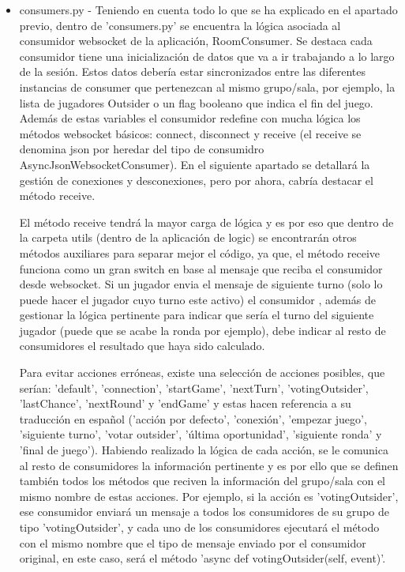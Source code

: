 \begin{itemize}
	\item consumers.py - Teniendo en cuenta todo lo que se ha explicado en el apartado previo, dentro de 'consumers.py' se encuentra la lógica asociada
	 	  al consumidor websocket de la aplicación, RoomConsumer. Se destaca cada consumidor tiene una inicialización de datos que va a ir trabajando
		  a lo largo de la sesión. Estos datos debería estar sincronizados entre las diferentes instancias de consumer que pertenezcan 
		  al mismo grupo/sala, por ejemplo, la lista de jugadores Outsider o un flag booleano que indica el fin del juego. Además de estas variables el consumidor 
		  redefine con mucha lógica los métodos websocket básicos: connect, disconnect y receive (el receive se denomina json por heredar del tipo de consumidro 
		  AsyncJsonWebsocketConsumer). En el siguiente apartado se detallará la gestión de conexiones y desconexiones, pero por ahora, cabría destacar el método receive.

		  El método receive tendrá la mayor carga de lógica y es por eso que dentro de la carpeta utils (dentro de la aplicación de logic) se encontrarán
		  otros métodos auxiliares para separar mejor el código, ya que, el método receive funciona como un gran switch en base al mensaje que reciba el
		  consumidor desde websocket. Si un jugador envia el mensaje de siguiente turno (solo lo puede hacer el jugador cuyo turno este activo) el consumidor 
		  , además de gestionar la lógica pertinente para indicar que sería el turno del siguiente jugador (puede que se acabe la ronda por ejemplo), debe indicar
		  al resto de consumidores el resultado que haya sido calculado.

		  Para evitar acciones erróneas, existe una selección de acciones posibles, que serían: 'default', 'connection', 'startGame', 'nextTurn', 
		  'votingOutsider', 'lastChance', 'nextRound' y 'endGame' y estas hacen referencia a su traducción en español ('acción por defecto', 'conexión', 
		  'empezar juego', 'siguiente turno', 'votar outsider', 'última oportunidad', 'siguiente ronda' y 'final de juego'). Habiendo realizado la lógica de cada
		  acción, se le comunica al resto de consumidores la información pertinente y es por ello que se definen también todos los métodos que reciven la información
		  del grupo/sala con el mismo nombre de estas acciones. Por ejemplo, si la acción es 'votingOutsider', ese consumidor enviará un mensaje a todos los consumidores 
		  de su grupo de tipo 'votingOutsider', y cada uno de los consumidores ejecutará el método con el mismo nombre que el tipo de mensaje enviado por el consumidor original,
		  en este caso, será el método 'async def votingOutsider(self, event)'.


\end{itemize}
